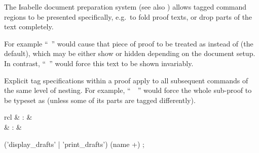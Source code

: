 \begin{isabellebody}
\begin{isamarkuptext}
  \medskip The Isabelle document preparation system (see also
  \cite{isabelle-sys}) allows tagged command regions to be presented
  specifically, e.g.\ to fold proof texts, or drop parts of the text
  completely.

  For example ``\hyperlink{command.by}{\mbox{}}~'' would
  cause that piece of proof to be treated as  instead
  of  (the default), which may be either show or hidden
  depending on the document setup.  In contrast, ``\hyperlink{command.by}{\mbox{}}~'' would force this text to be shown
  invariably.

  Explicit tag specifications within a proof apply to all subsequent
  commands of the same level of nesting.  For example, ``\hyperlink{command.proof}{\mbox{}}~~\hyperlink{command.qed}{\mbox{}}'' would force the
  whole sub-proof to be typeset as  (unless some of its
  parts are tagged differently).%
\end{isamarkuptext}%
\isamarkuptrue%
%
\isamarkuptrue%
%
\begin{isamarkuptext}%
\begin{matharray}{rcl}
    \hypertarget{command.display-drafts}{\hyperlink{command.display-drafts}{\mbox{}}}\isa{{\isachardoublequote}\isactrlsup {\isacharasterisk}{\isachardoublequote}} & : & \isarkeep{\cdot} \\
    \hypertarget{command.print-drafts}{\hyperlink{command.print-drafts}{\mbox{}}}\isa{{\isachardoublequote}\isactrlsup {\isacharasterisk}{\isachardoublequote}} & : & \isarkeep{\cdot} \\
  \end{matharray}

  \begin{rail}
    ('display\_drafts' | 'print\_drafts') (name +)
    ;
  \end{rail}

  \begin{descr}


\end{descr}
\end{isamarkuptext}
\end{isabellebody}
